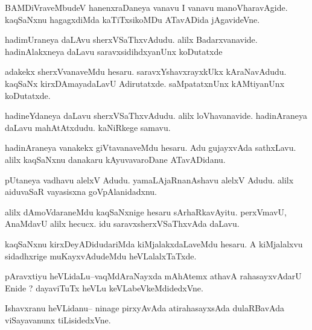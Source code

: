 \documentclass{article}
\begin{document}
\begin{mn}%
BAMDiVraveMbudeV hanenxraDaneya vanavu I vanavu manoVharavAgide. kaqSaNxnu hagagxdiMda 
kaTiTxsikoMDu ATavADida jAgavideVne.
\end{mn}

\begin{mn}%
hadimUraneya daLAvu sherxVSaThxvAdudu. alilx Badarxvanavide. hadinAlakxneya daLavu 
saravxsidihdxyanUnx koDutatxde
\end{mn}

\begin{mn}%
adakekx sherxVvanaveMdu hesaru. saravxYshavxrayxkUkx kAraNavAdudu. kaqSaNx 
kirxDAmayadaLavU Adirutatxde. saMpatatxnUnx kAMtiyanUnx koDutatxde.
\end{mn}

\begin{mn}%
hadineYdaneya daLavu sherxVSaThxvAdudu. alilx loVhavanavide. hadinAraneya daLavu 
mahAtAtxdudu. kaNiRkege samavu.
\end{mn}

\begin{mn}%
hadinAraneya vanakekx giVtavanaveMdu hesaru. Adu gujayxvAda sathxLavu. alilx kaqSaNxnu 
danakaru kAyuvavaroDane ATavADidanu.
\end{mn}

\begin{mn}%
pUtaneya vadhavu alelxV Adudu. yamaLAjaRnanAshavu alelxV Adudu. alilx aiduvaSaR vayasisxna 
goVpAlanidadxnu.
\end{mn}

\begin{mn}%
alilx dAmoVdaraneMdu kaqSaNxnige hesaru sArhaRkavAyitu. perxVmavU, AnaMdavU alilx hecucx. 
idu saravxsherxVSaThxvAda daLavu.
\end{mn}

\begin{mn}%
kaqSaNxnu kirxDeyADidudariMda kiMjalakxdaLaveMdu hesaru. A kiMjalalxvu sidadhxrige 
muKayxvAdudeMdu heVLalalxTaTxde.
\end{mn}

\begin{mn}%
pAravxtiyu heVLidaLu--vaqMdAraNayxda mAhAtemx athavA rahasayxvAdarU Enide ? dayaviTuTx heVLu 
keVLabeVkeMdidedxVne.
\end{mn}

\begin{mn}%
Ishavxranu heVLidanu-- ninage pirxyAvAda atirahasayxsAda dulaRBavAda viSayavanunx 
tiLisidedxVne.
\end{mn}
\end{document}
